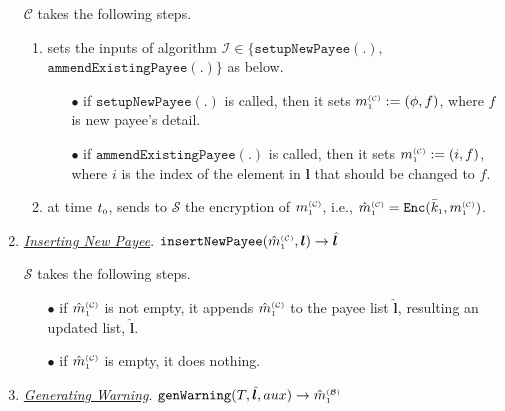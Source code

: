 \begin{enumerate}
$\mathcal{C}$ takes the following steps. 

\begin{enumerate}
%
\item sets the inputs of algorithm $\mathcal{I}\in \{\mathtt{setupNewPayee}(.), $ $ \mathtt{ammendExistingPayee}(.)\}$ as below. 
%
\begin{itemize}

\item[$\bullet$] if $\mathtt{setupNewPayee}(.)$ is called, then it sets $m_{\scriptscriptstyle 1}^{\scriptscriptstyle(\mathcal C)}:=(\phi,f)$, where $f$ is new payee's detail.  %
%
\item[$\bullet$] if $\mathtt{ammendExistingPayee}(.)$  is called, then it sets $m_{\scriptscriptstyle 1}^{\scriptscriptstyle(\mathcal C)}:=(i, f)$, where $i$ is the index of the element in $\bm l$ that should be changed to $f$.  %

\end{itemize}
\item at time $t_{\scriptscriptstyle 0}$, sends to $\mathcal{S}$  the encryption of $m_{\scriptscriptstyle 1}^{\scriptscriptstyle(\mathcal C)}$, i.e., $\hat m_{\scriptscriptstyle 1}^{\scriptscriptstyle(\mathcal C)}=\mathtt{Enc}(\bar k_{\scriptscriptstyle 1}, m_{\scriptscriptstyle 1}^{\scriptscriptstyle(\mathcal C)})$. 
\end{enumerate}
%
\vspace{2mm}
 \item \underline{\textit{Inserting New Payee}}. $\mathtt{insertNewPayee}(\hat m^{\scriptscriptstyle\mathcal{(C)}}_{\scriptscriptstyle 1}, {\bm l})\rightarrow {\hat{\bm l}}$
 
$\mathcal{S}$ takes the following steps. 
 \begin{itemize}
 \item[$\bullet$] if $\hat m_{\scriptscriptstyle 1}^{\scriptscriptstyle(\mathcal C)}$  is not empty, it appends $\hat m_{\scriptscriptstyle 1}^{\scriptscriptstyle(\mathcal C)}$ to the payee list $\hat{\bm l}$, resulting an updated list, $\hat{\bm l}$. 
  \item[$\bullet$] if $\hat m_{\scriptscriptstyle 1}^{\scriptscriptstyle(\mathcal C)}$ is empty,  it does nothing. 
 \end{itemize}
 
 


 \vspace{2mm}
\item \underline{\textit{Generating Warning}}. $\mathtt{genWarning}(T, {\hat{\bm l}}, aux)\rightarrow \hat m^{\scriptscriptstyle\mathcal{(B)}}_{\scriptscriptstyle1}$
%


\end{enumerate}
